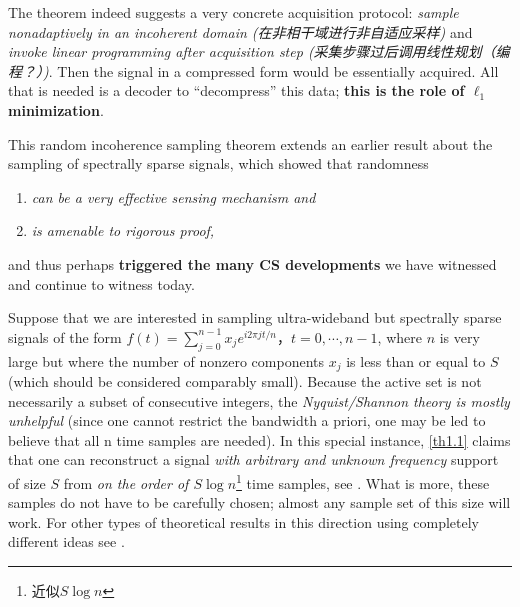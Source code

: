 The theorem indeed suggests a very concrete acquisition protocol: \emph{\textcolor[rgb]{1,0,0}{sample nonadaptively in an incoherent domain (在非相干域进行非自适应采样)}} and \emph{\textcolor[rgb]{1,0,0}{invoke linear programming after acquisition step (采集步骤过后调用线性规划（编程？）)}}. Then the signal in a compressed form would be essentially acquired. All that is needed is a decoder to ``decompress'' this data; \textcolor[rgb]{1,0,0}{\textbf{this is the role of $\ell_1$ minimization}}.

This random incoherence sampling theorem extends an earlier result about the sampling of spectrally sparse signals\cite{Candes2006}, which showed that randomness
\begin{enumerate}[1)]
	\item \emph{can be a very effective sensing mechanism and}
	\item \emph{is amenable to rigorous proof,}
\end{enumerate}and thus perhaps \textbf{\textcolor[rgb]{1,0,0}{triggered the many CS developments}} we have witnessed and continue to witness today. 

Suppose that we are interested in sampling ultra-wideband but spectrally sparse signals of the form $f(t)=\sum_{j=0}^{n-1}x_je^{i2\pi jt/n}，t=0,\cdots,n-1$, where $n$ is very large but where the number of nonzero components $x_j$ is less than or equal to $S$(which should be considered comparably small). Because the active set is not necessarily a subset of consecutive integers, the \emph{Nyquist/Shannon theory is mostly unhelpful} (since one cannot restrict the bandwidth a priori, one may be led to believe that all n time samples are needed).  In this special instance, \cref{th1.1} claims that one can reconstruct a signal \emph{with arbitrary and unknown frequency} support of size $S$ from \emph{on the order of $S \log n$}\footnote{近似$S \log n$} time samples, see \cite{Candes2006}. What is more, these samples do not have to be carefully chosen; almost any sample set of this size will work. For other types of theoretical results in this direction using completely different ideas see \cite{11,12,13}.

